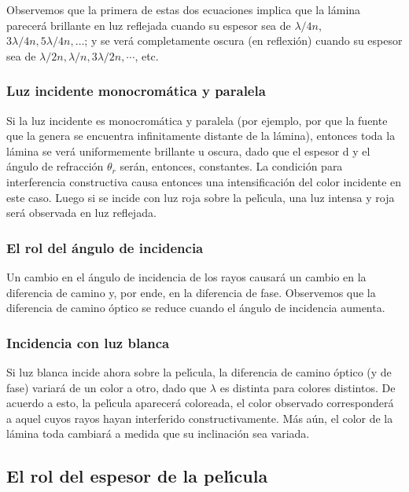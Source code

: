 \documentclass[a4paper]{article}
\begin{document}
Observemos que la primera de estas dos ecuaciones implica que la l\'amina
parecer\'a brillante en luz reflejada cuando su espesor sea de $\lambda/4n$,
$3 \lambda/4n, 5\lambda/4n, \ldots$; y se ver\'a completamente oscura 
(en reflexi\'on) cuando su espesor sea de $\lambda/2n, \lambda/n, 3\lambda/2n,
\cdots$, etc. 

\subsubsection{Luz incidente monocrom\'atica y paralela}

Si la luz incidente es monocrom\'atica y paralela (por ejemplo, por que la
fuente que la genera se encuentra infinitamente distante de la l\'amina), 
entonces toda la l\'amina se ver\'a uniformemente brillante u oscura, dado
que el espesor d y el \'angulo de refracci\'on $\theta_r$ ser\'an, entonces,
constantes. La condici\'on para interferencia constructiva causa entonces
una intensificaci\'on del color incidente en este caso. Luego si se incide
con luz roja sobre la pel\'\i cula, una luz intensa y roja ser\'a observada
en luz reflejada.

\subsubsection{El rol del \'angulo de incidencia}

Un cambio en el \'angulo de incidencia de los rayos causar\'a un cambio en la
diferencia de camino y, por ende, en la diferencia de fase. Observemos que la 
diferencia de camino \'optico se reduce cuando el \'angulo de incidencia 
aumenta.

\subsubsection{Incidencia con luz blanca}

Si luz blanca incide ahora sobre la pel\'\i cula, la diferencia de camino
\'optico (y de fase) variar\'a de un color a otro, dado que $\lambda$ es
distinta para colores distintos. De acuerdo a esto, la pel\'\i cula aparecer\'a
coloreada, el color observado corresponder\'a a aquel cuyos rayos hayan 
interferido constructivamente. M\'as a\'un, el color de la l\'amina toda 
cambiar\'a a medida que su inclinaci\'on sea variada.

\subsection{El rol del espesor de la pel\'\i cula}
\end{document}
